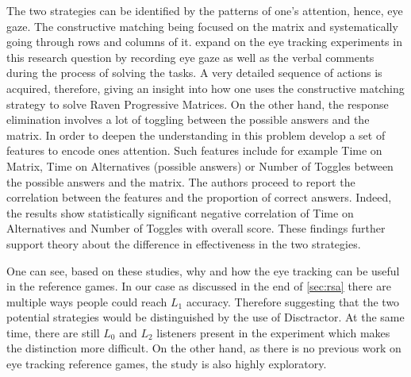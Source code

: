The two strategies can be identified by the patterns of one's attention, hence, eye gaze. The constructive matching being focused on the matrix and systematically going through rows and columns of it. \cite{Carpenter_1990} expand on the eye tracking experiments in this research question by recording eye gaze as well as the verbal comments during the process of solving the tasks. A very detailed sequence of actions is acquired, therefore, giving an insight into how one uses the constructive matching strategy to solve Raven Progressive Matrices. On the other hand, the response elimination involves a lot of toggling between the possible answers and the matrix. In order to deepen the understanding in this problem \cite{Vigneau_2006} develop a set of features to encode ones attention. Such features include for example Time on Matrix, Time on Alternatives (possible answers) or Number of Toggles between the possible answers and the matrix. The authors proceed to report the correlation between the features and the proportion of correct answers. Indeed, the results show statistically significant negative correlation of Time on Alternatives and Number of Toggles with overall score. These findings further support theory about the difference in effectiveness in the two strategies. 


One can see, based on these studies, why and how the eye tracking can be useful in the reference games. In our case as discussed in the end of \autoref{sec:rsa} there are multiple ways people could reach $L_1$ accuracy. Therefore suggesting that the two potential strategies would be distinguished by the use of Disctractor. At the same time, there are still $L_0$ and $L_2$ listeners present in the experiment which makes the distinction more difficult. On the other hand, as there is no previous work on eye tracking reference games, the study is also highly exploratory.

